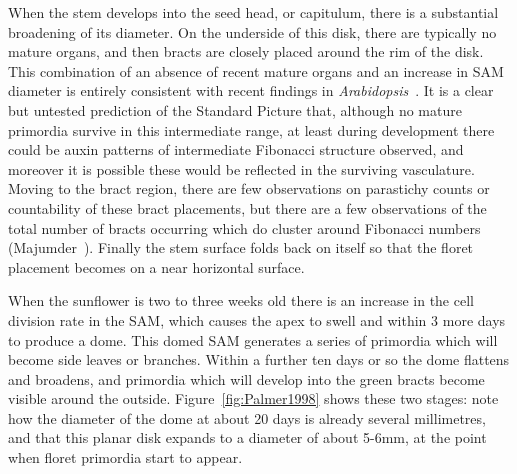 When the stem develops into the seed head, or capitulum, there is a substantial broadening of its diameter. On the underside of this disk,  there are typically no mature organs, and then bracts are closely placed around the rim of the disk. This combination of an absence of recent mature organs and an increase in SAM diameter is entirely consistent with recent findings in \textit{Arabidopsis}~\cite{shiFeedbackLateralOrgans2018}. It is a clear but untested prediction of the Standard Picture that, although no mature primordia survive in this intermediate range, at least during development there could be  auxin patterns of intermediate Fibonacci structure observed,  and moreover it is possible these would be reflected in the surviving vasculature. Moving to the bract region,  there are few observations on parastichy counts or countability of these bract placements, but there are a few observations of the total number of bracts occurring which do cluster around Fibonacci numbers (Majumder~\cite{majumderVariationNumberRay1976}). Finally the stem surface folds back on itself so that the floret placement becomes on a near horizontal surface.
	
When the sunflower is two to three weeks old there is an increase in the cell division rate in the SAM, which causes the apex to swell and within 3 more days to produce a dome. This domed SAM generates a series of primordia which will become side leaves or branches.%
Within a further ten days or so the dome flattens and broadens, and primordia which will develop into the green bracts become visible around the outside.  Figure~\ref{fig:Palmer1998} shows these two stages:  note how the diameter of the dome at about 20 days is already several millimetres, and that this planar disk expands to a diameter of about 5-6mm, at the point when floret primordia start to appear.


